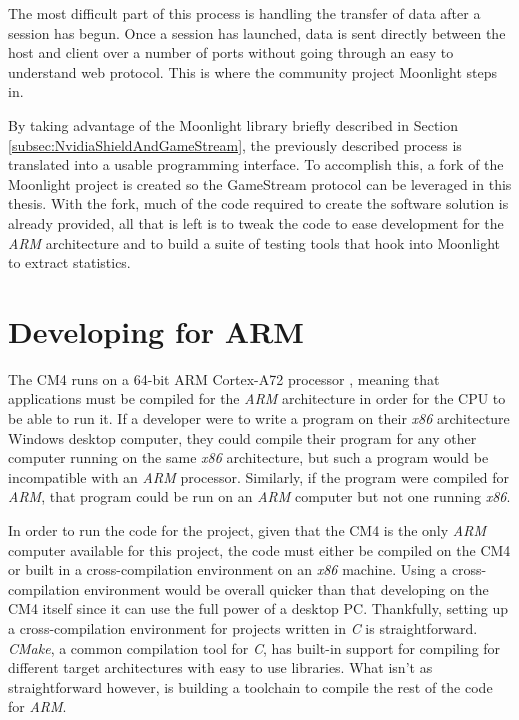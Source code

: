The most difficult part of this process is handling the transfer of data after a session has begun.
Once a session has launched, data is sent directly between the host and client over a number of ports without going through an easy to understand web protocol.
This is where the community project Moonlight steps in.

By taking advantage of the Moonlight library briefly described in Section \ref{subsec:NvidiaShieldAndGameStream}, the previously described process is translated  into a usable programming interface.
To accomplish this, a fork of the Moonlight project is created so the GameStream protocol can be leveraged in this thesis.
With the fork, much of the code required to create the software solution is already provided, all that is left is to tweak the code to ease development for the \emph{ARM} architecture and to build a suite of testing tools that hook into Moonlight to extract statistics.


\section{Developing for ARM}\label{sec:DevelopingForARM}

The CM4 runs on a 64-bit ARM Cortex-A72 processor \cite{rpi_cm4}, meaning that applications must be compiled for the \emph{ARM} architecture in order for the CPU to be able to run it.
If a developer were to write a program on their \emph{x86} architecture Windows desktop computer, they could compile their program for any other computer running on the same \emph{x86} architecture, but such a program would be incompatible with an \emph{ARM} processor.
Similarly, if the program were compiled for \emph{ARM}, that program could be run on an \emph{ARM} computer but not one running \emph{x86}.

In order to run the code for the project, given that the CM4 is the only \emph{ARM} computer available for this project, the code must either be compiled on the CM4 or built in a cross-compilation environment on an \emph{x86} machine.
Using a cross-compilation environment would be overall quicker than that developing on the CM4 itself since it can use the full power of a desktop PC.
Thankfully, setting up a cross-compilation environment for projects written in \emph{C} is straightforward.
\emph{CMake}, a common compilation tool for \emph{C}, has built-in support for compiling for different target architectures with easy to use libraries.
What isn't as straightforward however, is building a toolchain to compile the rest of the code for \emph{ARM}.

